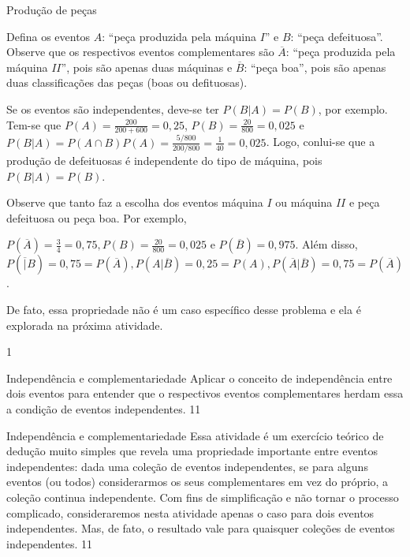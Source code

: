\begin{answer}{Produção de peças}
{
Defina os eventos $A$: “peça produzida pela máquina $I”$ e $B$: “peça defeituosa”. Observe que os respectivos eventos complementares são $\overline{A}$: “peça produzida pela máquina $II$”, pois são apenas duas máquinas e $\overline{B}$: “peça boa”, pois são apenas duas classificações das peças (boas ou defituosas).

Se os eventos são independentes, deve-se ter $P(B|A)=P(B)$, por exemplo. Tem-se que $P(A)=\frac{200}{200+600}=0{,}25$, $P(B)=\frac{20}{800}=0{,}025$ e $P(B|A)=P(A\cap B)P(A)=\frac{5/800}{200/800}=\frac{1}{40}=0{,}025$. Logo, conlui-se que a produção de defeituosas é independente do tipo de máquina, pois $P(B|A)=P(B)$.

Observe que tanto faz a escolha dos eventos máquina $I$ ou máquina $II$ e peça defeituosa ou peça boa. Por exemplo,

$P(\overline{A})=\frac{3}{4}=0{,}75, P(B)=\frac{20}{800}=0{,}025$ e $P(\overline{B})=0{,}975$. Além disso, $P(\overline|B)=0{,}75=P(\overline{A}), P(A|\overline{B})=0{,}25=P(A), P(\overline{A}|\overline{B})=0{,}75=P(\overline{A})$.

De fato, essa propriedade não é um caso específico desse problema e ela é explorada na próxima atividade.
}{1}
\end{answer}
\begin{objectives}{Independência e complementariedade}
{
Aplicar o conceito de independência entre dois eventos para entender que o respectivos eventos complementares herdam essa a condição de eventos independentes.
}{1}{1}
\end{objectives}
\begin{sugestions}{Independência e complementariedade}
{
Essa atividade é um exercício teórico de dedução muito simples que revela uma propriedade importante entre eventos independentes: dada uma coleção de eventos independentes, se para alguns eventos (ou todos) considerarmos os seus complementares em vez do próprio, a coleção continua independente. Com fins de simplificação e não tornar o processo complicado, consideraremos nesta atividade apenas o caso para dois eventos independentes. Mas, de fato, o resultado vale para quaisquer coleções de eventos independentes.
}{1}{1}
\end{sugestions}
